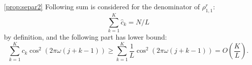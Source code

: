 \documentclass[12pt,a4paper,fleqn,leqno]{article}
\begin{document}
\begin{proof5}{\ref{prop:separ2}}
Following sum is considered for the denominator of $\rho^r_{1,1}$:
\begin{equation*}
\sum_{k=1}^K \hat c_k = N / L
\end{equation*}
by definition, and the following part has lower bound:
\begin{equation*}
\sum_{k=1}^K \hat c_k\cos^2(2 \pi \omega (j + k - 1)) \ge \sum_{k=1}^K \frac{1}{L}\cos^2(2 \pi \omega (j + k - 1)) = O \left(\frac{K}{L} \right).
\end{equation*}
\end{proof5}
\end{document}
